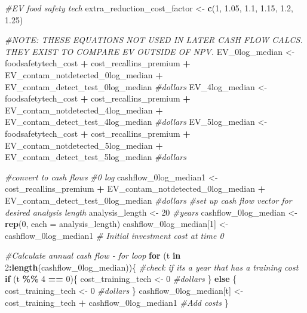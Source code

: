 \documentclass[
]{article}
\newenvironment{Shaded}{\begin{snugshade}}{\end{snugshade}}
\newcommand{\AttributeTok}[1]{\textcolor[rgb]{0.13,0.29,0.53}{#1}}
\newcommand{\CommentTok}[1]{\textcolor[rgb]{0.56,0.35,0.01}{\textit{#1}}}
\newcommand{\ControlFlowTok}[1]{\textcolor[rgb]{0.13,0.29,0.53}{\textbf{#1}}}
\newcommand{\DecValTok}[1]{\textcolor[rgb]{0.00,0.00,0.81}{#1}}
\newcommand{\FloatTok}[1]{\textcolor[rgb]{0.00,0.00,0.81}{#1}}
\newcommand{\FunctionTok}[1]{\textcolor[rgb]{0.13,0.29,0.53}{\textbf{#1}}}
\newcommand{\NormalTok}[1]{#1}
\newcommand{\OtherTok}[1]{\textcolor[rgb]{0.56,0.35,0.01}{#1}}
\newcommand{\SpecialCharTok}[1]{\textcolor[rgb]{0.81,0.36,0.00}{\textbf{#1}}}
\begin{document}
\begin{Shaded}
\begin{Highlighting}[]
\CommentTok{\#EV food safety tech}
\NormalTok{extra\_reduction\_cost\_factor }\OtherTok{\textless{}{-}} \FunctionTok{c}\NormalTok{(}\DecValTok{1}\NormalTok{, }\FloatTok{1.05}\NormalTok{, }\FloatTok{1.1}\NormalTok{, }\FloatTok{1.15}\NormalTok{, }\FloatTok{1.2}\NormalTok{, }\FloatTok{1.25}\NormalTok{)}

\CommentTok{\#NOTE: THESE EQUATIONS NOT USED IN LATER CASH FLOW CALCS. THEY EXIST TO COMPARE EV OUTSIDE OF NPV.}
\NormalTok{EV\_0log\_median }\OtherTok{\textless{}{-}}\NormalTok{ foodsafetytech\_cost }\SpecialCharTok{+}\NormalTok{ cost\_recallins\_premium }\SpecialCharTok{+}\NormalTok{ EV\_contam\_notdetected\_0log\_median }\SpecialCharTok{+}\NormalTok{ EV\_contam\_detect\_test\_0log\_median }\CommentTok{\#dollars}
\NormalTok{EV\_4log\_median }\OtherTok{\textless{}{-}}\NormalTok{ foodsafetytech\_cost }\SpecialCharTok{+}\NormalTok{ cost\_recallins\_premium }\SpecialCharTok{+}\NormalTok{ EV\_contam\_notdetected\_4log\_median }\SpecialCharTok{+}\NormalTok{ EV\_contam\_detect\_test\_4log\_median }\CommentTok{\#dollars}
\NormalTok{EV\_5log\_median }\OtherTok{\textless{}{-}}\NormalTok{ foodsafetytech\_cost }\SpecialCharTok{+}\NormalTok{ cost\_recallins\_premium }\SpecialCharTok{+}\NormalTok{ EV\_contam\_notdetected\_5log\_median }\SpecialCharTok{+}\NormalTok{ EV\_contam\_detect\_test\_5log\_median }\CommentTok{\#dollars}

\CommentTok{\#convert to cash flows}
\CommentTok{\#0 log}
\NormalTok{cashflow\_0log\_median1 }\OtherTok{\textless{}{-}}\NormalTok{ cost\_recallins\_premium }\SpecialCharTok{+}\NormalTok{ EV\_contam\_notdetected\_0log\_median }\SpecialCharTok{+}\NormalTok{ EV\_contam\_detect\_test\_0log\_median }\CommentTok{\#dollars}
\CommentTok{\#set up cash flow vector for desired analysis length}
\NormalTok{analysis\_length }\OtherTok{\textless{}{-}} \DecValTok{20} \CommentTok{\#years}
\NormalTok{cashflow\_0log\_median }\OtherTok{\textless{}{-}} \FunctionTok{rep}\NormalTok{(}\DecValTok{0}\NormalTok{, }\AttributeTok{each =}\NormalTok{ analysis\_length)}
\NormalTok{cashflow\_0log\_median[}\DecValTok{1}\NormalTok{] }\OtherTok{\textless{}{-}}\NormalTok{ cashflow\_0log\_median1   }\CommentTok{\# Initial investment cost at time 0}

\CommentTok{\#Calculate annual cash flow {-} for loop}
\ControlFlowTok{for}\NormalTok{ (t }\ControlFlowTok{in} \DecValTok{2}\SpecialCharTok{:}\FunctionTok{length}\NormalTok{(cashflow\_0log\_median))\{}
  \CommentTok{\#check if it\textquotesingle{}s a year that has a training cost}
  \ControlFlowTok{if}\NormalTok{ (t }\SpecialCharTok{\%\%} \DecValTok{4} \SpecialCharTok{==} \DecValTok{0}\NormalTok{)\{}
\NormalTok{    cost\_training\_tech }\OtherTok{\textless{}{-}} \DecValTok{0} \CommentTok{\#dollars}
\NormalTok{  \} }\ControlFlowTok{else}\NormalTok{ \{}
\NormalTok{    cost\_training\_tech }\OtherTok{\textless{}{-}} \DecValTok{0} \CommentTok{\#dollars}
\NormalTok{  \}}
\NormalTok{  cashflow\_0log\_median[t] }\OtherTok{\textless{}{-}}\NormalTok{ cost\_training\_tech }\SpecialCharTok{+}\NormalTok{ cashflow\_0log\_median1 }\CommentTok{\#Add costs}
\NormalTok{\}}




\end{Highlighting}
\end{Shaded}
\end{document}
